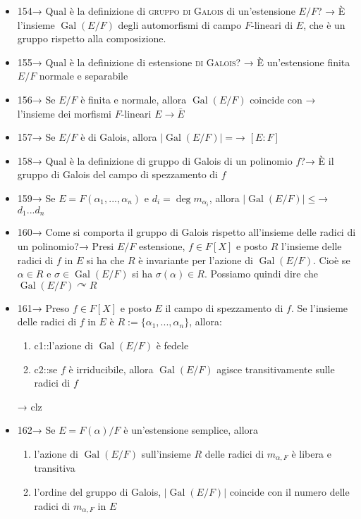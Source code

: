 \documentclass[A4,12pt]{article}
\newcommand{\acts}{\curvearrowright}
\begin{document}
\begin{itemize}[noitemsep]
		\item 154→ Qual è la definizione di \textsc{gruppo di Galois} di un'estensione $ E/F $? → È l'insieme $ \operatorname{Gal}(E/F) $ degli automorfismi di campo $ F $-lineari di $ E $, che è un gruppo rispetto alla composizione.
		\item 155→ Qual è la definizione di estensione \textsc{di Galois}? → È un'estensione finita $ E/F $ normale e separabile
		\item 156→ Se $ E/F $ è finita e normale, allora $ \operatorname{Gal}(E/F) $ coincide con → l'insieme dei morfismi $ F $-lineari $ E\to \bar E $
		\item 157→ Se $ E/F $ è di Galois, allora $ |\operatorname{Gal}(E/F)| = $→ $ [E:F]  $
		\item 158→ Qual è la definizione di gruppo di Galois di un polinomio $ f $?→	
		È il gruppo di Galois del campo di spezzamento di $ f $
		\item 159→ Se $ E=F(\alpha_1,...,\alpha_n) $ e $ d_i=\deg m_{\alpha_i} $, allora $ |\operatorname{Gal}(E/F)|\leq $→ $ d_1...d_n $ 
		\item 160→ Come si comporta il gruppo di Galois rispetto all'insieme delle radici di un polinomio?→ Presi $ E/F $ estensione, $f \in  F[X] $ e posto $ R $ l'insieme delle radici di  $ f $ in $ E $ si ha che $ R $ è invariante per l'azione di $ \operatorname{Gal}(E/F) $. Cioè se $ \alpha \in R $ e $ \sigma \in \operatorname{Gal}(E/F) $ si ha $ \sigma(\alpha)\in R $. Possiamo quindi dire che $ \operatorname{Gal}(E/F)\acts R $
		\item 161→ Preso $ f\in F[X] $ e posto $ E $ il campo di spezzamento di $ f $. Se l'insieme delle radici di $ f $ in $ E $ è $ R:= \{\alpha_1,...,\alpha_n\} $, allora: \begin{enumerate}
			\item {{c1::l'azione di $ \operatorname{Gal}(E/F) $ è fedele}}
			\item {{c2::se $ f $ è irriducibile, allora $ \operatorname{Gal}(E/F) $ agisce transitivamente sulle radici di $ f $}}
		\end{enumerate} → clz
		\item 162→ Se $ E=F(\alpha)/F $ è un'estensione semplice, allora \begin{enumerate}
			\item l'azione di $ \operatorname{Gal}(E/F) $ sull'insieme $ R $ delle radici di $ m_{\alpha,F} $ è libera e transitiva
			\item l'ordine del gruppo di Galois, $ |\operatorname{Gal}(E/F) |$ coincide con il numero delle radici di $ m_{\alpha,F} $ in $ E $

\end{enumerate}
\end{itemize}
\end{document}

